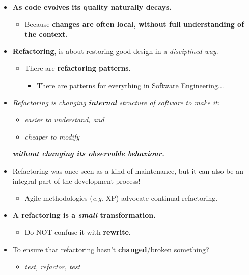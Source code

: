 \documentclass[a4paper]{article}
\providecommand{\tightlist}{%
  \setlength{\itemsep}{0pt}\setlength{\parskip}{0pt}}
\begin{document}
\begin{itemize}
\item
  \textbf{As code evolves its quality naturally decays.}

  \begin{itemize}
  \tightlist
  \item
    Because \textbf{changes are often local, without full understanding
    of the context.}
  \end{itemize}
\item
  \textbf{Refactoring}, is about restoring good design in a
  \emph{disciplined way}.

  \begin{itemize}
  \tightlist
  \item
    There are \textbf{refactoring patterns}.

    \begin{itemize}
    \tightlist
    \item
      There are patterns for everything in Software Engineering...
    \end{itemize}
  \end{itemize}
\item
  \emph{Refactoring is changing \textbf{internal} structure of software
  to make it:}

  \begin{itemize}
  \tightlist
  \item
    \emph{easier to understand, and}
  \item
    \emph{cheaper to modify}
  \end{itemize}

  \emph{\textbf{without changing its observable behaviour.}}
\item
  Refactoring was once seen as a kind of maintenance, but it can also be
  an integral part of the development process!

  \begin{itemize}
  \tightlist
  \item
    Agile methodologies (\emph{e.g.} XP) advocate continual refactoring.
  \end{itemize}
\item
  \textbf{A refactoring is a \emph{small} transformation.}

  \begin{itemize}
  \tightlist
  \item
    Do NOT confuse it with \textbf{rewrite}.
  \end{itemize}
\item
  To ensure that refactoring hasn't \textbf{changed}/broken something?

  \begin{itemize}
  \tightlist
  \item
    \emph{test, refactor, test}
  \end{itemize}
\end{itemize}
\end{document}
